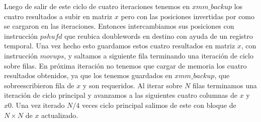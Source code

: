 Luego de salir de este ciclo de cuatro iteraciones tenemos en $xmm\_backup$ los cuatro resultados a subir en 
 matriz $x$ pero con las posiciones invertidas por como se cargaron en las iteraciones. Entonces
 intercambiamos sus posiciones con instrucción $pshufd$ que reubica doublewords en destino con 
 ayuda de un registro temporal. Una vez hecho esto guardamos estos cuatro resultados en matriz $x$, con instrucción $movups$, y 
 saltamos a siguiente fila terminando una iteración de ciclo sobre filas. En próxima iteración
 no tenemos que cargar de memoria los cuatro resultados obtenidos, ya que los tenemos guardados en
 $xmm\_backup$, que sobreescribieron fila de $x$ y son requeridos.
 Al iterar sobre $N$ filas terminamos una iteración de ciclo principal y avanzamos a las 
 siguientes cuatro columnas de $x$ y $x0$. Una vez iterado $N/4$ veces ciclo principal salimos de este con bloque de 
 $N\times N$ de $x$ actualizado.

